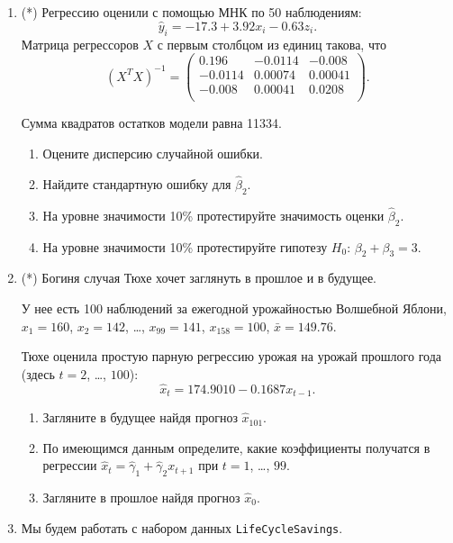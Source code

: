 \documentclass[12pt]{article}
\begin{document}
\begin{enumerate}
\newpage
    \item (*) Регрессию оценили с помощью МНК по 50 наблюдениям:
    \[
    \hat y_i = -17.3 + 3.92 x_i - 0.63 z_i.    
    \]
    Матрица регрессоров $X$ с первым столбцом из единиц такова, что 
    \[
    (X^TX)^{-1} = \begin{pmatrix}
        0.196 & -0.0114 & -0.008 \\
        -0.0114 &  0.00074 & 0.00041 \\
        -0.008 & 0.00041 & 0.0208 \\
    \end{pmatrix}.    
    \]

    Сумма квадратов остатков модели равна 11334.

\begin{enumerate}
    \item Оцените дисперсию случайной ошибки.
    \item Найдите стандартную ошибку для $\hat\beta_2$.
    \item На уровне значимости 10\% протестируйте значимость оценки $\hat\beta_2$.
    \item На уровне значимости 10\% протестируйте гипотезу $H_0$: $\beta_2 + \beta_3 = 3$.
\end{enumerate}


\item (*) Богиня случая Тюхе хочет заглянуть в прошлое и в будущее. 

У нее есть 100 наблюдений за ежегодной урожайностью Волшебной Яблони,
$x_1 = 160$, $x_2 = 142$, \ldots, $x_{99} = 141$, $x_{158} = 100$, 
$\bar x = 149.76$. 

Тюхе оценила простую парную регрессию урожая на урожай прошлого года (здесь $t=2$, \ldots, $100$):
\[
\hat x_t = 174.9010 - 0.1687 x_{t-1}.
\]

\begin{enumerate}
    \item Загляните в будущее найдя прогноз $\hat x_{101}$.
    \item По имеющимся данным определите, какие коэффициенты получатся 
    в регрессии $\hat x_t = \hat\gamma_1 +\hat\gamma_2 x_{t+1}$ при $t=1$, \ldots, $99$.
    \item Загляните в прошлое найдя прогноз $\hat x_{0}$.
\end{enumerate}


\newpage
    \item Мы будем работать с набором данных \verb|LifeCycleSavings|.


\end{enumerate}
\end{document}

